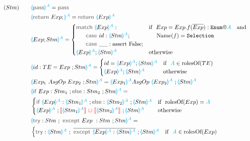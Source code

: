 \documentclass[11pt]{jarticle}
\newcommand{\projection}[2]{{\color{cyan}\llparenthesis}#1{\color{cyan}\rrparenthesis^#2}}
\newcommand{\gray}[1]{\textbf{\textsf{\color{Gray}#1}}}
\newcommand{\cyan}[1]{\color{cyan}#1}
\newcommand{\nl}[1]{{\color{red}{\llbracket}}#1{\color{red}{\rrbracket}}} %
\newcommand{\mg}{~{\color{red}{\sqcup}}~} %
\begin{document}
\begin{alignat*}{2}
  &(Stm)~~~ &&\projection{\gray{pass}}{A} = \gray{pass}\\
  &&&\projection{\gray{return} ~ Exp;}{A} = \gray{return} ~ \projection{Exp}{A}\\
  &&&\projection{Exp;Stm}{A} =
  \begin{cases}
    \gray{match} ~\projection{Exp}{A}: & \text{if}~~Exp = Exp.f(\overline{Exp}):\texttt{Enum}\gray{@}{\cyan{A}}~~~\text{and}\\
    ~~~~~\gray{case} ~id: \projection{Stm}{A}; &~~~~ \text{Name}(f) = \texttt{Selection}\\%
    ~~~~~\gray{case} ~\_\_: \text{assert False}; \\
    \projection{Exp}{A};\projection{Stm}{A} & \text{otherwise}\\
  \end{cases}\\
  &&& \projection{id:TE = Exp~;Stm}{A} =
  \begin{cases}
    id = \projection{Exp}{A};\projection{Stm}{A} & \text{if}~~ {\color{cyan}A} \in \text{rolesOf}(TE)\\
    \projection{Exp}{A};\projection{Stm}{A} & \text{otherwise}
  \end{cases}\\
  &&& \projection{Exp_1 ~AsgOp~ Exp_2 ~; Stm}{A} = \projection{Exp_1}{A} AsgOp~ \projection{Exp_2}{A} ~; \projection{Stm}{A} \\
  &&&\projection{\gray{if}~Exp:Stm_1~;\gray{else}:Stm_2 ~;Stm}{A}=\\
  &&&
  \begin{cases}
    \gray{if}~\projection{Exp}{A} : \projection{Stm_1}{A} ~; \gray{else}:\projection{Stm_2}{A} ~;\projection{Stm}{A} & \text{if}~~ \text{rolesOf}(Exp) = \cyan{A}\\
    \projection{Exp}{A} ~; \nl{\projection{Stm_1}{A}} \mg \nl{\projection{Stm_2}{A}} ~;\projection{Stm}{A} & \text{otherwise}
  \end{cases}\\
  &&&\projection{\gray{try}:Stm ~;~ \gray{except}~Exp~:Stm ~;Stm}{A} =\\
  &&&
  \begin{cases}
    \gray{try}:\projection{Stm}{A}~;~\overline{\gray{except}~ \projection{Exp}{A} : \projection{Stm}{A}}~;\projection{Stm}{A} & \text{if}~~ {\cyan{A}} \in \text{rolesOf}(Exp)\\
  \end{cases}\\
\end{alignat*}
\end{document}
